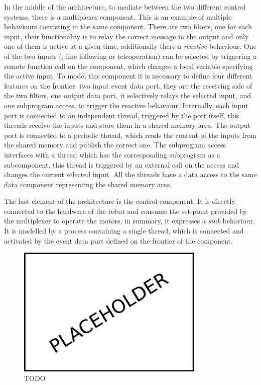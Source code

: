 In the middle of the architecture, to mediate between the two different control systems, there is a multiplexer component. This is an example of multiple behaviours coexisting in the same component. There are two filters, one for each input, their functionality is to relay the correct message to the output and only one of them is active at a given time, additionally there a \textit{reactive} behaviour. One of the two inputs (\ie, line following or teleoperation) can be selected by triggering a remote function call on the component, which changes a local variable specifying the active input. To model this component it is necessary to define four different features on the frontier: two input event data port, they are the receiving side of the two filters, one output data port, it selectively relays the selected input, and one subprogram access, to trigger the reactive behaviour. Internally, each input port is connected to an independent thread, triggered by the port itself, this threads receive the inputs and store them in a shared memory area. The output port is connected to a periodic thread, which reads the content of the inputs from the shared memory and publish the correct one. The subprogram access interfaces with a thread which has the corresponding subprogram as a subcomponent, this thread is triggered by an external call on the access and changes the current selected input. All the threads have a data access to the same data component representing the shared memory area.

The last element of the architecture is the control component. It is directly connected to the hardware of the robot and consume the set-point provided by the multiplexer to operate the motors, in summary, it expresses a \textit{sink} behaviour. It is modelled by a process containing a single thread, which is connected and activated by the event data port defined on the frontier of the component.

\begin{figure}[t]
    \centering
    \includegraphics[width=0.8\textwidth]{gfx/placeholder}
    \caption{TODO}\label{fig:connections}
\end{figure}

